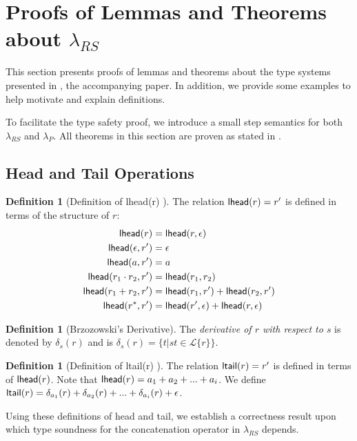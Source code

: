 \documentclass[12pt]{article}
\theoremstyle{definition}
\newtheorem{defn}[thm]{Definition}
\newcommand{\Lagr}{\mathcal{L}}
\newcommand{\lang}[1]{\Lagr\{#1\}}
\newcommand{\lambdas}{\lambda_{RS}}
\newcommand{\lambdap}{\lambda_P}
\newcommand{\lhead}[1]{ {\sf lhead}(#1) }
\newcommand{\ltail}[1]{ {\sf ltail}(#1) }
\begin{document}
\section{Proofs of Lemmas and Theorems about $\lambdas$}

This section presents proofs of lemmas and theorems about the type systems
presented in \cite{fulton2014}, the accompanying paper. In addition, we provide some examples to help 
motivate and explain definitions.

To facilitate the type safety proof, we introduce
a small step semantics for both $\lambdas$ and $\lambdap$. All theorems in
this section are proven as stated in \cite{fulton2014}.

\subsection{Head and Tail Operations}

\begin{defn}[Definition of \lhead{r}]\label{def:lhead}
The relation $\lhead{r}=r'$ is defined in terms of the structure of $r$:
\begin{align*}
\lhead{r}                 &= \lhead{r, \epsilon} \\
\lhead{\epsilon, r'}      &= \epsilon \\
\lhead{a, r'}             &= a \\
\lhead{r_1\cdot r_2, r'}  &= \lhead{r_1, r_2} \\
\lhead{r_1 + r_2, r'}     &= \lhead{r_1, r'} + \lhead{r_2, r'} \\
\lhead{r^*, r'}           &= \lhead{r', \epsilon} + \lhead{r, \epsilon}
\end{align*}
\end{defn}

\begin{defn}[Brzozowski's Derivative]\label{def:derivative}
  The \emph{derivative of $r$ with respect to $s$} is denoted by $\delta_s(r)$
  and is $\delta_s(r) = \{t | st \in \lang{r}\}$.
\end{defn}

\begin{defn}[Definition of \ltail{r}]
The relation $\ltail{r} = r'$ is defined in terms of $\lhead{r}$.
Note that $\lhead{r} = a_1 + a_2 + ... + a_i$.
We define $\ltail{r} = \delta_{a_1}(r) + \delta_{a_2}(r) + ... + \delta_{a_i}(r) + \epsilon$.
\end{defn}

Using these definitions of head and tail, we establish a correctness
result upon which type soundness for the concatenation operator in
$\lambdas$ depends.
\end{document}
